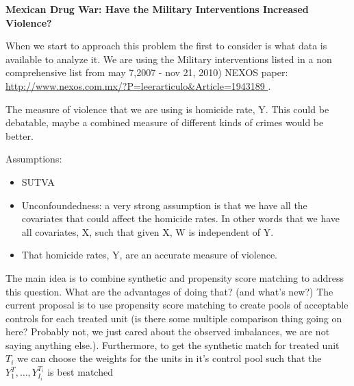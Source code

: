 \documentclass{article}[11 pt]
\begin{document}
\begin{center}	
	\textbf{Mexican Drug War: Have the Military Interventions Increased Violence?}
\end{center}

When we start to approach this problem the first to consider is what data is available to analyze it. We are using the Military interventions listed in a non comprehensive list from may 7,2007 - nov 21, 2010) NEXOS paper: \url{http://www.nexos.com.mx/?P=leerarticulo&Article=1943189 }. %

The measure of violence that we are using is homicide rate, Y. This could be debatable, maybe a combined measure of different kinds of crimes would be better.

Assumptions:
\begin{itemize}
	\item SUTVA
	\item Unconfoundedness: a very strong assumption is that we have all the covariates that could affect the homicide rates. In other words that we have all covariates, X, such that given X,  W is independent of Y.
	\item That homicide rates, Y, are an accurate measure of violence. 
\end{itemize}

The main idea is to combine synthetic and propensity score matching to address this question. What are the advantages of doing that? (and what's new?)
The current proposal is to use propensity score matching to create pools of acceptable controls for each treated unit (is there some multiple comparison thing going on here? Probably not, we just cared about the observed imbalances, we are not saying anything else.). Furthermore, to get the synthetic match for treated unit $T_i$ we can choose the weights for the units in it's control pool such that the $Y_1^T,\ldots, Y_{I_i}^{T_i}$ is best matched
\end{document}

